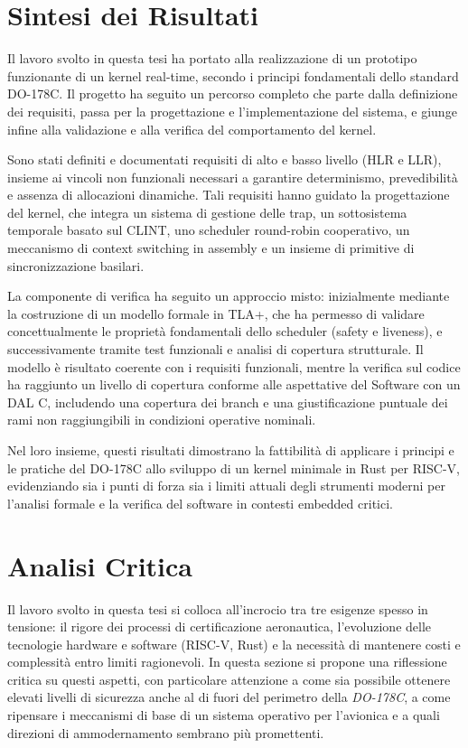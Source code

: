 \documentclass[italian, Lau, oneside]{sapthesis} %
\begin{document}
\section{Sintesi dei Risultati}

Il lavoro svolto in questa tesi ha portato alla realizzazione di un prototipo funzionante di un kernel real-time, secondo i principi fondamentali dello standard DO-178C. Il progetto ha seguito un percorso completo che parte dalla definizione dei requisiti, passa per la progettazione e l’implementazione del sistema, e giunge infine alla validazione e alla verifica del comportamento del kernel.

Sono stati definiti e documentati requisiti di alto e basso livello (HLR e LLR), insieme ai vincoli non funzionali necessari a garantire determinismo, prevedibilità e assenza di allocazioni dinamiche. Tali requisiti hanno guidato la progettazione del kernel, che integra un sistema di gestione delle trap, un sottosistema temporale basato sul CLINT, uno scheduler round-robin cooperativo, un meccanismo di context switching in assembly e un insieme di primitive di sincronizzazione basilari.

La componente di verifica ha seguito un approccio misto: inizialmente mediante la costruzione di un modello formale in TLA+, che ha permesso di validare concettualmente le proprietà fondamentali dello scheduler (safety e liveness), e successivamente tramite test funzionali e analisi di copertura strutturale. Il modello è risultato coerente con i requisiti funzionali, mentre la verifica sul codice ha raggiunto un livello di copertura conforme alle aspettative del Software con un DAL C, includendo una copertura dei branch e una giustificazione puntuale dei rami non raggiungibili in condizioni operative nominali.

Nel loro insieme, questi risultati dimostrano la fattibilità di applicare i principi e le pratiche del DO-178C allo sviluppo di un kernel minimale in Rust per RISC-V, evidenziando sia i punti di forza sia i limiti attuali degli strumenti moderni per l’analisi formale e la verifica del software in contesti embedded critici.

\section{Analisi Critica}
\label{sec:analisi-critica}

Il lavoro svolto in questa tesi si colloca all’incrocio tra tre esigenze spesso in tensione: il rigore dei processi di certificazione aeronautica, l’evoluzione delle tecnologie hardware e software (RISC-V, Rust) e la necessità di mantenere costi e complessità entro limiti ragionevoli. In questa sezione si propone una riflessione critica su questi aspetti, con particolare attenzione a come sia possibile ottenere elevati livelli di sicurezza anche al di fuori del perimetro della \textit{DO-178C}, a come ripensare i meccanismi di base di un sistema operativo per l’avionica e a quali direzioni di ammodernamento sembrano più promettenti.
\end{document}
